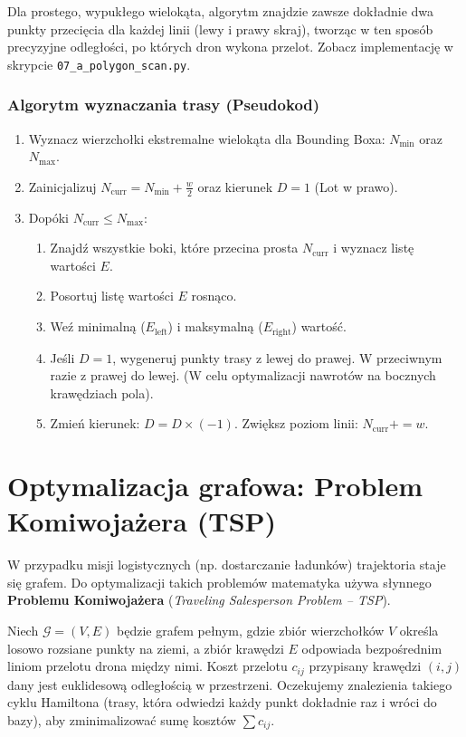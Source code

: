Dla prostego, wypukłego wielokąta, algorytm znajdzie zawsze dokładnie dwa punkty przecięcia dla każdej linii (lewy i prawy skraj), tworząc w ten sposób precyzyjne odległości, po których dron wykona przelot. Zobacz implementację w skrypcie \texttt{07\_a\_polygon\_scan.py}.

\subsubsection{Algorytm wyznaczania trasy (Pseudokod)}
\begin{enumerate}
    \item Wyznacz wierzchołki ekstremalne wielokąta dla Bounding Boxa: $N_{\min}$ oraz $N_{\max}$.
    \item Zainicjalizuj $N_{\text{curr}} = N_{\min} + \frac{w}{2}$ oraz kierunek $D = 1$ (Lot w prawo).
    \item Dopóki $N_{\text{curr}} \le N_{\max}$:
    \begin{enumerate}
        \item Znajdź wszystkie boki, które przecina prosta $N_{\text{curr}}$ i wyznacz listę wartości $E$.
        \item Posortuj listę wartości $E$ rosnąco.
        \item Weź minimalną ($E_{\text{left}}$) i maksymalną ($E_{\text{right}}$) wartość.
        \item Jeśli $D = 1$, wygeneruj punkty trasy z lewej do prawej. W przeciwnym razie z prawej do lewej. (W celu optymalizacji nawrotów na bocznych krawędziach pola).
        \item Zmień kierunek: $D = D \times (-1)$. Zwiększ poziom linii: $N_{\text{curr}} += w$.
    \end{enumerate}
\end{enumerate}


\section{Optymalizacja grafowa: Problem Komiwojażera (TSP)}

W przypadku misji logistycznych (np. dostarczanie ładunków) trajektoria staje się grafem. Do optymalizacji takich problemów matematyka używa słynnego \textbf{Problemu Komiwojażera} (\textit{Traveling Salesperson Problem -- TSP}).

Niech $\mathcal{G} = (V, E)$ będzie grafem pełnym, gdzie zbiór wierzchołków $V$ określa losowo rozsiane punkty na ziemi, a zbiór krawędzi $E$ odpowiada bezpośrednim liniom przelotu drona między nimi. Koszt przelotu $c_{ij}$ przypisany krawędzi $(i,j)$ dany jest euklidesową odległością w przestrzeni. Oczekujemy znalezienia takiego cyklu Hamiltona (trasy, która odwiedzi każdy punkt dokładnie raz i wróci do bazy), aby zminimalizować sumę kosztów $\sum c_{ij}$.

